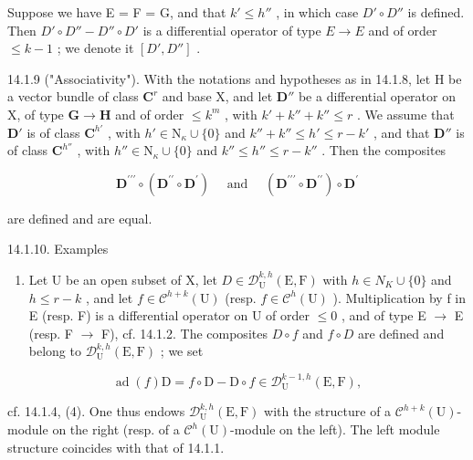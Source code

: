 Suppose we have E = F = G, and that \(k' \leqslant h''\) , in which case \(D' \circ D''\) is defined. Then \(D' \circ D'' - D'' \circ D'\) is a differential operator of type \(E \to E\) and of order \(\leqslant k - 1\) ; we denote it \([D', D'']\) .

14.1.9 ("Associativity"). With the notations and hypotheses as in 14.1.8, let H be a vector bundle of class \(\mathbf{C}^r\) and base X, and let \(\mathbf{D}''\) be a differential operator on X, of type \(\mathbf{G} \to \mathbf{H}\) and of order \(\leqslant k^{m}\) , with \(k' + k'' + k'' \leqslant r\) . We assume that \(\mathbf{D}'\) is of class \(\mathbf{C}^{h'}\) , with \(h' \in \mathrm{N}_{\kappa} \cup \{0\}\) and \(k'' + k'' \leqslant h' \leqslant r - k'\) , and that \(\mathbf{D}''\) is of class \(\mathbf{C}^{h''}\) , with \(h'' \in \mathrm{N}_{\kappa} \cup \{0\}\) and \(k'' \leqslant h'' \leqslant r - k''\) . Then the composites

\[
\mathbf {D} ^ {\prime \prime \prime} \circ (\mathbf {D} ^ {\prime \prime} \circ \mathbf {D} ^ {\prime}) \quad \text { and } \quad (\mathbf {D} ^ {\prime \prime \prime} \circ \mathbf {D} ^ {\prime \prime}) \circ \mathbf {D} ^ {\prime}
\]

are defined and are equal.

14.1.10. Examples

\begin{enumerate}
\def\labelenumi{\alph{enumi})}
\tightlist
\item
  Let U be an open subset of X, let \(D \in \mathcal{D}_{\mathrm{U}}^{k,h}(\mathrm{E}, \mathrm{F})\) with \(h \in N_{K} \cup \{0\}\) and \(h \leqslant r-k\) , and let \(f \in \mathcal{C}^{h+k}(\mathrm{U})\) (resp. \(f \in \mathcal{C}^{h}(\mathrm{U})\) ). Multiplication by f in E (resp. F) is a differential operator on U of order \(\leqslant0\) , and of type E \(\to\) E (resp. F \(\to\) F), cf. 14.1.2. The composites \(D\circ f\) and \(f\circ D\) are defined and belong to \(\mathcal{D}_{\mathrm{U}}^{k,h}(\mathrm{E},\mathrm{F})\) ; we set
\end{enumerate}

\[
\operatorname{ad} (f) \mathrm{D} = f \circ \mathrm{D} - \mathrm{D} \circ f \in \mathcal {D} _ {\mathrm{U}} ^ {k - 1, h} (\mathrm{E}, \mathrm{F}),
\]

cf. 14.1.4, (4). One thus endows \(\mathcal{D}_{\mathrm{U}}^{k,h}(\mathrm{E},\mathrm{F})\) with the structure of a \(\mathcal{C}^{h+k}(\mathrm{U})\)-module on the right (resp. of a \(\mathcal{C}^h (\mathrm{U})\)-module on the left). The left module structure coincides with that of 14.1.1.

